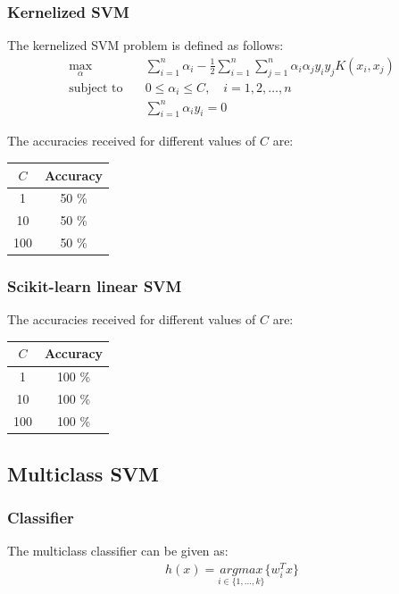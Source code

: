\documentclass[12pt]{article}
\begin{document}
\subsubsection{Kernelized SVM}
The kernelized SVM problem is defined as follows:
\begin{align*}
    \max_{\alpha} \quad &\sum_{i=1}^{n}\alpha_i - \frac{1}{2}\sum_{i=1}^{n}\sum_{j=1}^{n}\alpha_i\alpha_jy_iy_jK(x_i, x_j) \\
    \text{subject to} \quad &0 \leq \alpha_i \leq C, \quad i = 1, 2, \ldots, n \\
    &\sum_{i=1}^{n}\alpha_iy_i = 0
\end{align*}

The accuracies received for different values of $C$ are:
\begin{center}
    \begin{tabular}{|c|c|}
        \hline
        $C$ & Accuracy \\
        \hline
        1 & 50 \% \\
        10 & 50 \% \\
        100 & 50 \% \\
        \hline
    \end{tabular}
\end{center}

\subsubsection{Scikit-learn linear SVM}
The accuracies received for different values of $C$ are:
\begin{center}
    \begin{tabular}{|c|c|}
        \hline
        $C$ & Accuracy \\
        \hline
        1 & 100 \% \\
        10 & 100 \% \\
        100 & 100 \% \\
        \hline
    \end{tabular}
\end{center}


\subsection{Multiclass SVM}
\subsubsection{Classifier}
The multiclass classifier can be given as:
\begin{align*}
    h(x) = \underset{i \in \{1,\dots,k\}}{argmax} \{w_i^Tx\}
\end{align*}
\end{document}
